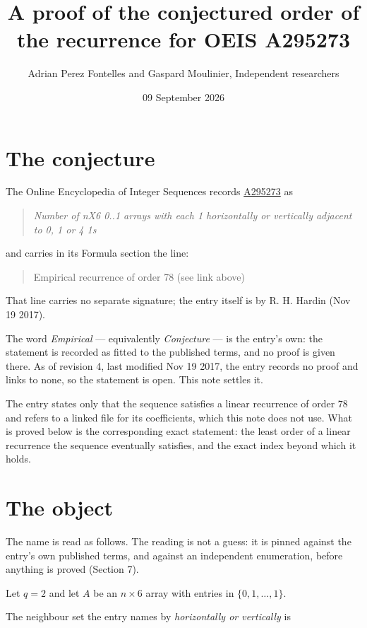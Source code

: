 \documentclass[11pt]{article}
\title{A proof of the conjectured order of the recurrence for OEIS A295273}
\author{Adrian Perez Fontelles and Gaspard Moulinier, Independent researchers}
\date{09 September 2026}
\theoremstyle{definition}
\begin{document}
\maketitle
\section{The conjecture}

The Online Encyclopedia of Integer Sequences records \href{https://oeis.org/A295273}{A295273} as

\begin{quote}\itshape Number of nX6 0..1 arrays with each 1 horizontally or vertically adjacent to 0, 1 or 4 1s\end{quote}

and carries in its Formula section the line:

\begin{quote}\ttfamily Empirical recurrence of order 78 (see link above)\end{quote}

That line carries no separate signature; the entry itself is by R. H. Hardin (Nov 19 2017).

The word {\itshape Empirical} --- equivalently {\itshape Conjecture} --- is the entry's own: the statement is recorded as fitted to the published terms, and no proof is given there. As of revision 4, last modified Nov 19 2017, the entry records no proof and links to none, so the statement is open. This note settles it.

The entry states only that the sequence satisfies a linear recurrence of order $78$ and refers to a linked file for its coefficients, which this note does not use. What is proved below is the corresponding exact statement: the least order of a linear recurrence the sequence eventually satisfies, and the exact index beyond which it holds.

\section{The object}

The name is read as follows. The reading is not a guess: it is pinned against the entry's own published terms, and against an independent enumeration, before anything is proved (Section 7).

Let $q = 2$ and let $A$ be an $n \times 6$ array with entries in $\{0,1,\dots,1\}$.

The neighbour set the entry names by {\itshape horizontally or vertically} is
\end{document}
